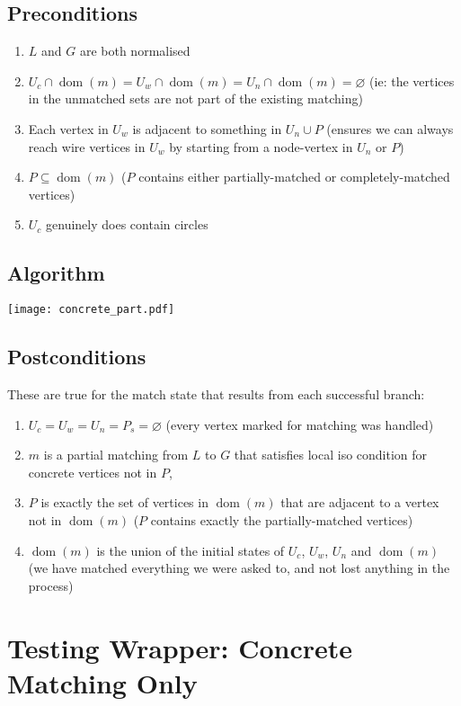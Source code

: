 \documentclass{article}
\DeclareMathOperator{\dom}{dom}
\begin{document}
\subsection{Preconditions}
\begin{enumerate}
  \item $L$ and $G$ are both normalised
  \item $U_c\cap\dom(m) = U_w\cap\dom(m) = U_n\cap\dom(m) = \varnothing$ (ie: the vertices in the unmatched sets are not part of the existing matching)
  \item Each vertex in $U_w$ is adjacent to something in $U_n\cup P$ (ensures we can always reach wire vertices in $U_w$ by starting from a node-vertex in $U_n$ or $P$)
  \item $P \subseteq \dom(m)$ ($P$ contains either partially-matched or completely-matched vertices)
  \item $U_c$ genuinely does contain circles
\end{enumerate}

\subsection{Algorithm}
\begin{center}
  \texttt{[image: concrete\_part.pdf]}
\end{center}

\subsection{Postconditions}
These are true for the match state that results from each successful branch:
\begin{enumerate}
  \item $U_c = U_w = U_n = P_s = \varnothing$ (every vertex marked for matching was handled)
  \item $m$ is a partial matching from $L$ to $G$ that satisfies local iso condition for concrete vertices not in $P$,
  \item $P$ is exactly the set of vertices in $\dom(m)$ that are adjacent to a vertex not in $\dom(m)$ ($P$ contains exactly the partially-matched vertices)
  \item $\dom(m)$ is the union of the initial states of $U_c$, $U_w$, $U_n$ and $\dom(m)$ (we have matched everything we were asked to, and not lost anything in the process)
\end{enumerate}

\section{Testing Wrapper: Concrete Matching Only}
\end{document}
